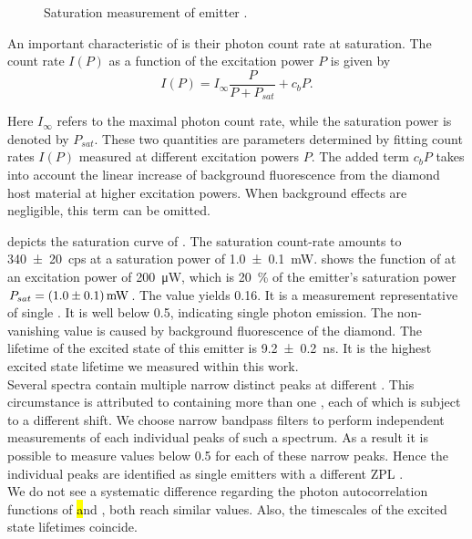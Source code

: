 		
		\begin{figure}[!htb]
			\centering
			\caption{Saturation measurement of emitter \embroad.}
			\label{fig::sat_Ir8}
		\end{figure}

		An important characteristic of \spss is their photon count rate at saturation. The count rate $I(P)$ as a function of the excitation power $P$ is given by
		\begin{equation}
			I(P) = I_{\infty} \frac{P}{P + P_{sat}} + c_b P.
		\end{equation}

		Here $I_{\infty}$ refers to the maximal photon count rate, while the saturation power is denoted by $P_{sat}$. These two quantities are parameters determined by fitting count rates $I(P)$ measured at different excitation powers $P$. The added term $c_b P$ takes into account the linear increase of background fluorescence from the diamond host material at higher excitation powers. When background effects are negligible, this term can be omitted.

		 depicts the saturation curve of \embroad.
		The saturation count-rate amounts to \SI[separate-uncertainty]{340\pm20}{cps} at a saturation power of \SI[separate-uncertainty]{1.0\pm0.1}{mW}.
		 shows the \gt function of \embroad at an excitation power of \SI{200}{\micro\W}, which is \SI{20}{\percent} of the emitter's saturation power $P_{sat}=\SI[separate-uncertainty]{1.0\pm0.1}{mW}$.
		The \gtz value yields \num{0.16}.
		It is a \gt measurement representative of single \sivs.
		It is well below \num{0.5}, indicating single photon emission.
		The non-vanishing \gtz value is caused by background fluorescence of the diamond.
		The lifetime of the excited state of this emitter is \SI[separate-uncertainty]{9.2\pm0.2}{ns}.
		It is the highest excited state lifetime we measured within this work.
		\\
		Several \nd \pl spectra contain multiple narrow distinct peaks at different \wls.
		This circumstance is attributed to \nds containing more than one \siv, each of which is subject to a different \ZPL \wl shift.
		We choose narrow bandpass filters to perform independent measurements of each individual peaks of such a spectrum.
		As a result it is possible to measure \gtz values below \num{0.5} for each of these narrow peaks.
		Hence the individual peaks are identified as single emitters with a different ZPL \cwl.
		\\
		We do not see a systematic difference regarding the photon autocorrelation functions of \hl and \vl, both reach similar \gtz values.
		Also, the timescales of the excited state lifetimes coincide.
